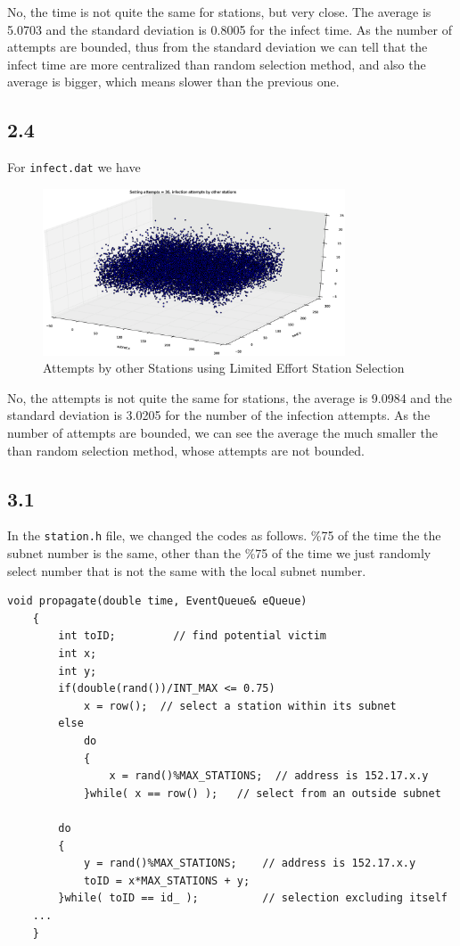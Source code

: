 \documentclass[10pt]{article}
\begin{document}
No, the time is not quite the same for stations, but very close. The average is 5.0703 and the standard deviation is 0.8005 for the infect time. As the number of attempts are bounded, thus from the standard deviation we can tell that the infect time are more centralized than random selection method, and also the average is
bigger, which means slower than the previous one.

\subsection*{2.4}
For \texttt{infect.dat} we have

\begin{figure}[H]
\begin{center}
\includegraphics[width=0.8\textwidth]{figure2.4.eps}
\caption{Attempts by other Stations using Limited Effort Station Selection}
\end{center}
\end{figure}

No, the attempts is not quite the same for stations, the average is 9.0984 and the standard deviation is 3.0205 for the number of the infection attempts. As the number of attempts are bounded, we can see the average the much smaller the than random selection method, whose attempts are not bounded.

\subsection*{3.1}

In the \texttt{station.h} file, we changed the codes as follows. \%75 of the time the the subnet number is the same, other than the \%75 of the time we just randomly select number that is not the same with the local subnet number.

\begin{lstlisting}
void propagate(double time, EventQueue& eQueue)
	{
		int toID;         // find potential victim
		int x;
		int y;
		if(double(rand())/INT_MAX <= 0.75)
			x = row();	// select a station within its subnet		
		else				
			do
			{	
				x = rand()%MAX_STATIONS;  // address is 152.17.x.y
			}while( x == row() );	// select from an outside subnet	

		do
		{	
			y = rand()%MAX_STATIONS;  	// address is 152.17.x.y
			toID = x*MAX_STATIONS + y;
		}while( toID == id_ );			// selection excluding itself
    ...
    }
\end{lstlisting}
\end{document}
